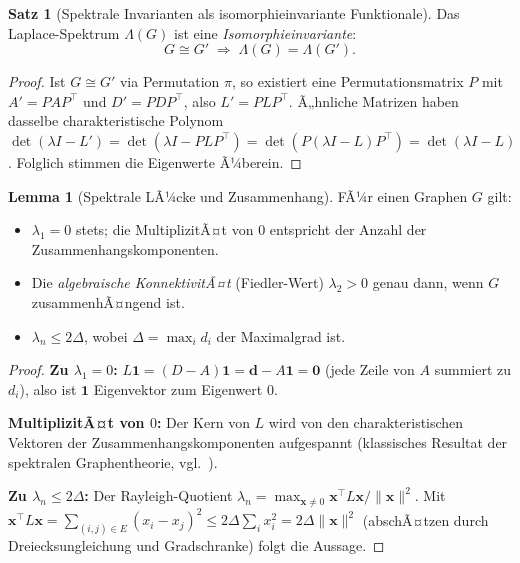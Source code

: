 ﻿\documentclass[a4paper,12pt]{article}
\theoremstyle{definition}
\newtheorem{satz}{Satz}
\newtheorem{lemma}{Lemma}
\begin{document}
\begin{satz}[Spektrale Invarianten als isomorphieinvariante Funktionale]
\label{satz:spek}
    Das Laplace-Spektrum $\Lambda(G)$ ist eine \emph{Isomorphieinvariante}:
    \[
    G \cong G' \;\Longrightarrow\; \Lambda(G) = \Lambda(G').
    \]
\end{satz}

\begin{proof}
    Ist $G \cong G'$ via Permutation $\pi$, so existiert eine Permutationsmatrix $P$ mit
    $A' = P A P^\top$ und $D' = P D P^\top$, also $L' = P L P^\top$.
    Ã„hnliche Matrizen haben dasselbe charakteristische Polynom $\det(\lambda I - L') =
    \det(\lambda I - PLP^\top) = \det(P(\lambda I - L)P^\top) = \det(\lambda I - L)$.
    Folglich stimmen die Eigenwerte Ã¼berein. \qedhere
\end{proof}

\begin{lemma}[Spektrale LÃ¼cke und Zusammenhang]
\label{lem:gap}
    FÃ¼r einen Graphen $G$ gilt:
    \begin{itemize}
        \item $\lambda_1 = 0$ stets; die MultiplizitÃ¤t von $0$ entspricht der Anzahl der
              Zusammenhangskomponenten.
        \item Die \emph{algebraische KonnektivitÃ¤t} (Fiedler-Wert) $\lambda_2 > 0$
              genau dann, wenn $G$ zusammenhÃ¤ngend ist.
        \item $\lambda_n \leq 2\Delta$, wobei $\Delta = \max_i d_i$ der Maximalgrad ist.
    \end{itemize}
\end{lemma}

\begin{proof}
    \textbf{Zu $\lambda_1=0$:} $L\mathbf{1} = (D-A)\mathbf{1} = \mathbf{d} - A\mathbf{1} = \mathbf{0}$
    (jede Zeile von $A$ summiert zu $d_i$), also ist $\mathbf{1}$ Eigenvektor zum Eigenwert $0$.

    \textbf{MultiplizitÃ¤t von $0$:} Der Kern von $L$ wird von den charakteristischen
    Vektoren der Zusammenhangskomponenten aufgespannt (klassisches Resultat der spektralen
    Graphentheorie, vgl.~\cite{mohar1991}).

    \textbf{Zu $\lambda_n \leq 2\Delta$:} Der Rayleigh-Quotient
    $\lambda_n = \max_{\mathbf{x}\neq 0} \mathbf{x}^\top L \mathbf{x}/\|\mathbf{x}\|^2$.
    Mit $\mathbf{x}^\top L \mathbf{x} = \sum_{(i,j)\in E}(x_i - x_j)^2 \leq
    2\Delta \sum_i x_i^2 = 2\Delta \|\mathbf{x}\|^2$ (abschÃ¤tzen durch Dreiecksungleichung
    und Gradschranke) folgt die Aussage. \qedhere
\end{proof}
\end{document}
